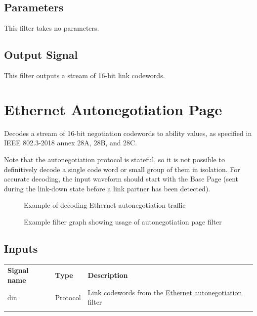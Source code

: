 \subsection{Parameters}

This filter takes no parameters.

\subsection{Output Signal}

This filter outputs a stream of 16-bit link codewords.

\pagebreak
\section{Ethernet Autonegotiation Page}
\label{filter:anegpage}

Decodes a stream of 16-bit negotiation codewords to ability values, as specified in IEEE 802.3-2018 annex 28A, 28B, and
28C.

Note that the autonegotiation protocol is stateful, so it is not possible to definitively decode a single code word or
small group of them in isolation. For accurate decoding, the input waveform should start with the Base Page (sent
during the link-down state before a link partner has been detected).

\begin{figure}[h]
\centering
{}
\caption{Example of decoding Ethernet autonegotiation traffic}
\label{filter_ethernet_aneg_page}
\end{figure}

\begin{figure}[h]
\centering
{}
\caption{Example filter graph showing usage of autonegotiation page filter}
\label{filter_aneg_page}
\end{figure}
\FloatBarrier

\subsection{Inputs}

\begin{tabularx}{16cm}{llX}
\thickhline
\textbf{Signal name} & \textbf{Type} & \textbf{Description} \\
\thickhline
din & Protocol & Link codewords from the \hyperref[filter:aneg]{Ethernet autonegotiation} filter\\
\thickhline
\end{tabularx}


